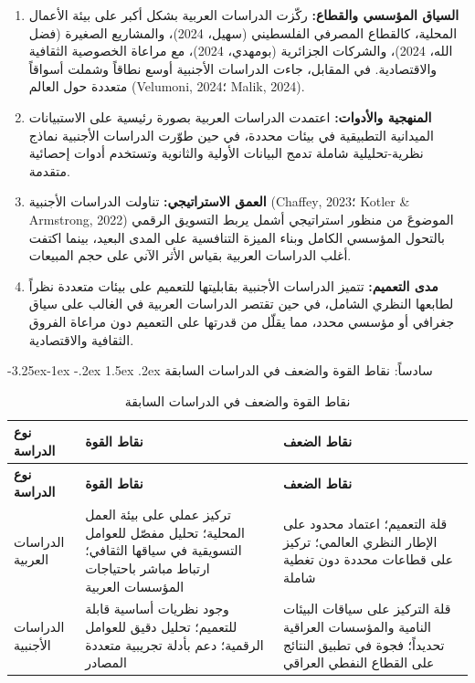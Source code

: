 \documentclass[12pt, a4paper]{report}
\makeatletter
\newcommand{\lr}[1]{\textenglish{#1}}
\renewcommand\subsection{\@startsection{subsection}{2}{\z@}%
  {-3.25ex\@plus -1ex \@minus -.2ex}%
  {1.5ex \@plus .2ex}%
  {\normalfont\large\bfseries\color{sectiongray}}}
\makeatother
\begin{document}
\begin{enumerate}[label=\arabic*.]
  \item \textbf{السياق المؤسسي والقطاع:}
  ركّزت الدراسات العربية بشكل أكبر على بيئة الأعمال المحلية، كالقطاع المصرفي الفلسطيني (سهيل، 2024)، والمشاريع الصغيرة (فضل الله، 2024)، والشركات الجزائرية (بومهدي، 2024)، مع مراعاة الخصوصية الثقافية والاقتصادية. في المقابل، جاءت الدراسات الأجنبية أوسع نطاقاً وشملت أسواقاً متعددة حول العالم (\lr{Velumoni}, 2024؛ \lr{Malik}, 2024).

  \item \textbf{المنهجية والأدوات:}
  اعتمدت الدراسات العربية بصورة رئيسية على الاستبيانات الميدانية التطبيقية في بيئات محددة، في حين طوّرت الدراسات الأجنبية نماذج نظرية-تحليلية شاملة تدمج البيانات الأولية والثانوية وتستخدم أدوات إحصائية متقدمة.

  \item \textbf{العمق الاستراتيجي:}
  تناولت الدراسات الأجنبية (\lr{Chaffey}, 2023؛ \lr{Kotler \& Armstrong}, 2022) الموضوعَ من منظور استراتيجي أشمل يربط التسويق الرقمي بالتحول المؤسسي الكامل وبناء الميزة التنافسية على المدى البعيد، بينما اكتفت أغلب الدراسات العربية بقياس الأثر الآني على حجم المبيعات.

  \item \textbf{مدى التعميم:}
  تتميز الدراسات الأجنبية بقابليتها للتعميم على بيئات متعددة نظراً لطابعها النظري الشامل، في حين تقتصر الدراسات العربية في الغالب على سياق جغرافي أو مؤسسي محدد، مما يقلّل من قدرتها على التعميم دون مراعاة الفروق الثقافية والاقتصادية.
\end{enumerate}

\subsection{سادساً: نقاط القوة والضعف في الدراسات السابقة}

\begin{center}
\begin{longtable}{|p{3.5cm}|p{5.5cm}|p{5cm}|}
\caption{نقاط القوة والضعف في الدراسات السابقة}\label{tab:strengths_weaknesses}\\
\hline
\rowcolor{tableheader}
\textbf{نوع الدراسة} & \textbf{نقاط القوة} & \textbf{نقاط الضعف} \\
\hline
\endfirsthead
\hline
\rowcolor{tableheader}
\textbf{نوع الدراسة} & \textbf{نقاط القوة} & \textbf{نقاط الضعف} \\
\hline
\endhead
الدراسات العربية & تركيز عملي على بيئة العمل المحلية؛ تحليل مفصّل للعوامل التسويقية في سياقها الثقافي؛ ارتباط مباشر باحتياجات المؤسسات العربية & قلة التعميم؛ اعتماد محدود على الإطار النظري العالمي؛ تركيز على قطاعات محددة دون تغطية شاملة \\
\hline
الدراسات الأجنبية & وجود نظريات أساسية قابلة للتعميم؛ تحليل دقيق للعوامل الرقمية؛ دعم بأدلة تجريبية متعددة المصادر & قلة التركيز على سياقات البيئات النامية والمؤسسات العراقية تحديداً؛ فجوة في تطبيق النتائج على القطاع النفطي العراقي \\
\hline
\end{longtable}
\end{center}
\end{document}
